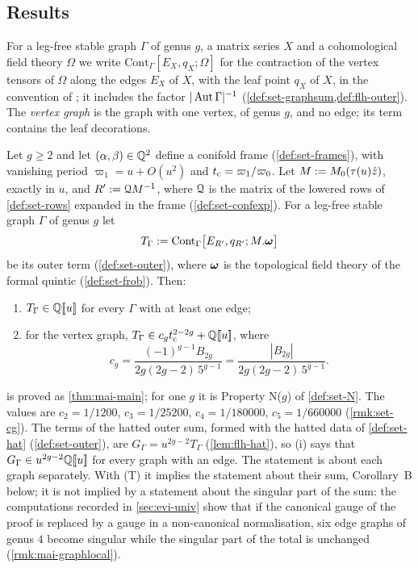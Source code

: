 
\subsection{Results}
\label{sec:int-results}

For a leg-free stable graph $\Gamma$ of genus $g$, a matrix series $X$ and a cohomological field theory $\Omega$ we write $\mathrm{Cont}_\Gamma[E_X,q_X;\Omega]$ for the contraction of the vertex tensors of $\Omega$ along the edges $E_X$ of $X$, with the leaf point $q_X$ of $X$, in the convention of \cite[Defs.~2.2, 2.13]{PPZ15}; it includes the factor $|\operatorname{Aut}\Gamma|^{-1}$ (\cref{def:set-graphsum,def:flh-outer}). The \emph{vertex graph} is the graph with one vertex, of genus $g$, and no edge; its term contains the leaf decorations.

\begin{thm}[Theorem~A]
\label{thm:int-main}
Let $g\geq2$ and let $(\alpha,\beta)\in\mathbb{Q}^2$ define a conifold frame (\cref{def:set-frames}), with vanishing period $\varpi_1=u+O(u^2)$ and $t_{\mathrm{c}}=\varpi_1/\varpi_0$. Let $M:=M_{0}(\tau(u)\hat{z})$, exactly in $u$, and $R':=\mathcal{Q} M^{-1}$, where $\mathcal{Q}$ is the matrix of the lowered rows of \cref{def:set-rows} expanded in the frame (\cref{def:set-confexp}). For a leg-free stable graph $\Gamma$ of genus $g$ let
\[
T_\Gamma:=\mathrm{Cont}_\Gamma\bigl[E_{R'},q_{R'};M.\boldsymbol{\omega}\bigr]
\]
be its outer term (\cref{def:set-outer}), where $\boldsymbol{\omega}$ is the topological field theory of the formal quintic (\cref{def:set-frob}). Then:
\begin{enumerate}
\item $T_\Gamma\in\mathbb{Q}[\![ u ]\!]$ for every $\Gamma$ with at least one edge;
\item for the vertex graph, $T_\Gamma\in c_gt_{\mathrm{c}}^{2-2g}+\mathbb{Q}[\![ u ]\!]$, where
\[
c_g=\frac{(-1)^{g-1}B_{2g}}{2g(2g-2)\,5^{g-1}}=\frac{|B_{2g}|}{2g(2g-2)\,5^{g-1}} .
\]
\end{enumerate}
\end{thm}

 is proved as \cref{thm:mai-main}; for one $g$ it is Property N($g$) of \cref{def:set-N}. The values are $c_2=1/1200$, $c_3=1/25200$, $c_4=1/180000$, $c_5=1/660000$ (\cref{rmk:set-cg}). The terms of the hatted outer sum, formed with the hatted data of \cref{def:set-hat} (\cref{def:set-outer}), are $G_\Gamma=u^{2g-2}T_\Gamma$ (\cref{lem:flh-hat}), so (i) says that $G_\Gamma\in u^{2g-2}\mathbb{Q}[\![ u ]\!]$ for every graph with an edge. The statement is about each graph separately. With (T) it implies the statement about their sum, Corollary~B below; it is not implied by a statement about the singular part of the sum: the computations recorded in \cref{sec:evi-univ} show that if the canonical gauge of the proof is replaced by a gauge in a non-canonical normalisation, six edge graphs of genus $4$ become singular while the singular part of the total is unchanged (\cref{rmk:mai-graphlocal}).

